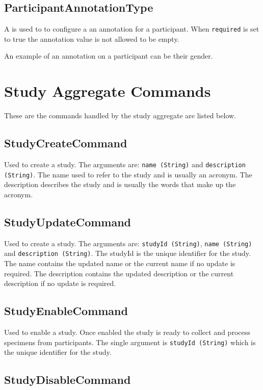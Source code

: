 \subsection*{ParticipantAnnotationType}

A  is used to to configure a an
annotation for a participant. When \texttt{required} is set to true the
annotation value is not allowed to be empty.

An example of an annotation on a participant can be their gender.

\section {Study Aggregate Commands}

These are the commands handled by the study aggregate are listed below.

\subsection*{StudyCreateCommand}

Used to create a study. The arguments are: \texttt{name (String)} and
\texttt{description (String)}. The name used to refer to the study and is
usually an acronym. The description describes the study and is usually the
words that make up the acronym.

\subsection*{StudyUpdateCommand}

Used to create a study. The arguments are: \texttt{studyId (String)},
\texttt{name (String)} and \texttt{description (String)}. The studyId is the
unique identifier for the study. The name contains the updated name or the
current name if no update is required. The description contains the updated
description or the current description if no update is required.

\subsection*{StudyEnableCommand}

Used to enable a study. Once enabled the study is ready to collect and process
specimens from participants. The single argument is \texttt{studyId (String)}
which is the unique identifier for the study.

\subsection*{StudyDisableCommand}

